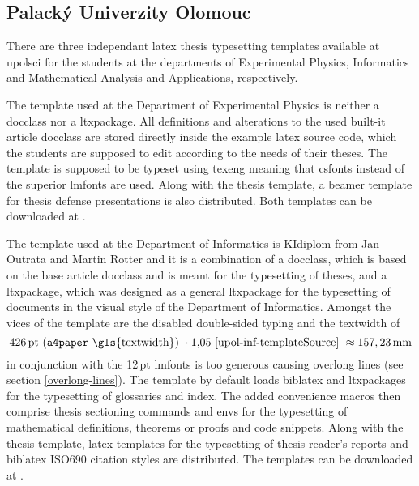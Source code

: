 \documentclass[12pt,twoside,cover,color,table]%
  {fithesis3/fithesis3/fithesis3} %
\begin{document}
  \subsection{Palacký Univerzity Olomouc}
  There are three independant \gls{latex} thesis typesetting
  templates available at \acrlong{upolsci} for the students at the
  departments of Experimental Physics, Informatics and Mathematical
  Analysis and Applications, respectively.

  The template used at the Department of Experimental Physics is
  neither a \gls{docclass} nor a \gls{ltxpackage}. All definitions
  and alterations to the used built-it article \gls{docclass} are
  stored directly inside the example \gls{latex} source code, which
  the students are supposed to edit according to the needs of their
  theses. The template is supposed to be typeset using
   \gls{texeng} meaning that
  \gls{csfonts} instead of the superior \gls{lmfonts} are used.
  Along with the thesis template, a \gls{beamer} template for
  thesis defense presentations is also distributed\pending{}. Both
  templates can be downloaded at \cite{upol-exfyz-template}.

   The template used at the Department of
  Informatics is KIdiplom from Jan Outrata and Martin Rotter and it
  is a combination of a \gls{docclass}, which is based on the base
  article \gls{docclass} and is meant for the typesetting of
  theses, and a \gls{ltxpackage}, which was designed as a general
  \gls{ltxpackage} for the typesetting of documents in the visual
  style of the Department of Informatics. Amongst the vices of the
  template are the disabled double-sided typing
  \cite[lines~69--72]{upol-inf-templateSource} and the
  \gls{textwidth} of\begin{equation}
    426\text{\,pt}\text{ (\texttt{a4paper} \gls{textwidth}) }
    \cdot1{,}05\text{ \cite[line~81]{upol-inf-templateSource} }
    \approx157,23\text{\,mm}
  \end{equation} in conjunction with the 12\,pt \gls{lmfonts} is
  too generous \cite[lines~74--82]{upol-inf-templateSource} causing
  overlong lines (see section \ref{overlong-lines}). The template
  by default loads \gls{biblatex} and \glspl{ltxpackage} for the
  typesetting of glossaries and index. The added convenience macros
  then comprise thesis sectioning commands and \glspl{env} for the
  typesetting of mathematical definitions, theorems or proofs and
  code snippets. Along with the thesis template, \gls{latex}
  templates for the typesetting of thesis reader's
  reports and \gls{biblatex}
  ISO\hyph{}690 \cite{iso690-1,iso690-2} citation styles\pending{}
  are distributed. The templates can be downloaded at
  \cite{upol-inf-template}.
\end{document}
